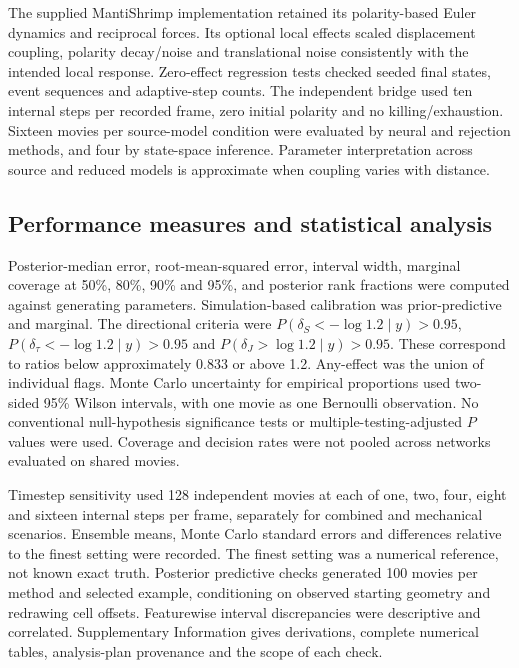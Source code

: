 \documentclass[12pt]{article}
\begin{document}
The supplied MantiShrimp implementation retained its polarity-based Euler dynamics and reciprocal forces. Its optional local effects scaled displacement coupling, polarity decay/noise and translational noise consistently with the intended local response. Zero-effect regression tests checked seeded final states, event sequences and adaptive-step counts. The independent bridge used ten internal steps per recorded frame, zero initial polarity and no killing/exhaustion. Sixteen movies per source-model condition were evaluated by neural and rejection methods, and four by state-space inference. Parameter interpretation across source and reduced models is approximate when coupling varies with distance.

\subsection*{Performance measures and statistical analysis}
Posterior-median error, root-mean-squared error, interval width, marginal coverage at 50\%, 80\%, 90\% and 95\%, and posterior rank fractions were computed against generating parameters. Simulation-based calibration was prior-predictive and marginal\citep{talts2018,sailynoja2022}. The directional criteria were $P(\delta_S<-\log1.2\mid y)>0.95$, $P(\delta_\tau<-\log1.2\mid y)>0.95$ and $P(\delta_J>\log1.2\mid y)>0.95$. These correspond to ratios below approximately 0.833 or above 1.2. Any-effect was the union of individual flags. Monte Carlo uncertainty for empirical proportions used two-sided 95\% Wilson intervals, with one movie as one Bernoulli observation. No conventional null-hypothesis significance tests or multiple-testing-adjusted $P$ values were used. Coverage and decision rates were not pooled across networks evaluated on shared movies.

Timestep sensitivity used 128 independent movies at each of one, two, four, eight and sixteen internal steps per frame, separately for combined and mechanical scenarios. Ensemble means, Monte Carlo standard errors and differences relative to the finest setting were recorded. The finest setting was a numerical reference, not known exact truth. Posterior predictive checks generated 100 movies per method and selected example, conditioning on observed starting geometry and redrawing cell offsets. Featurewise interval discrepancies were descriptive and correlated. Supplementary Information gives derivations, complete numerical tables, analysis-plan provenance and the scope of each check.
\end{document}
